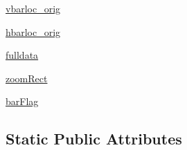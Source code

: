 \begin{DoxyCompactItemize}
\item 
\hyperlink{classmy_zm_peak_display_1_1my_zm_peak_display_adf7a9d7f5ca82215805acbc121e9d42d}{vbarloc\-\_\-orig}
\item 
\hyperlink{classmy_zm_peak_display_1_1my_zm_peak_display_a9f46ba18c0baa95bd2c7ec8b70dcddbe}{hbarloc\-\_\-orig}
\item 
\hyperlink{classmy_zm_peak_display_1_1my_zm_peak_display_a2ad52ce54407b62ce8829e538a845049}{fulldata}
\item 
\hyperlink{classmy_zm_peak_display_1_1my_zm_peak_display_aead8ab13c78f41a35434760be199264a}{zoom\-Rect}
\item 
\hyperlink{classmy_zm_peak_display_1_1my_zm_peak_display_ab0a84e7b6930d7b42d51c4bc0a2fc4ec}{bar\-Flag}
\end{DoxyCompactItemize}
\subsection*{Static Public Attributes}
